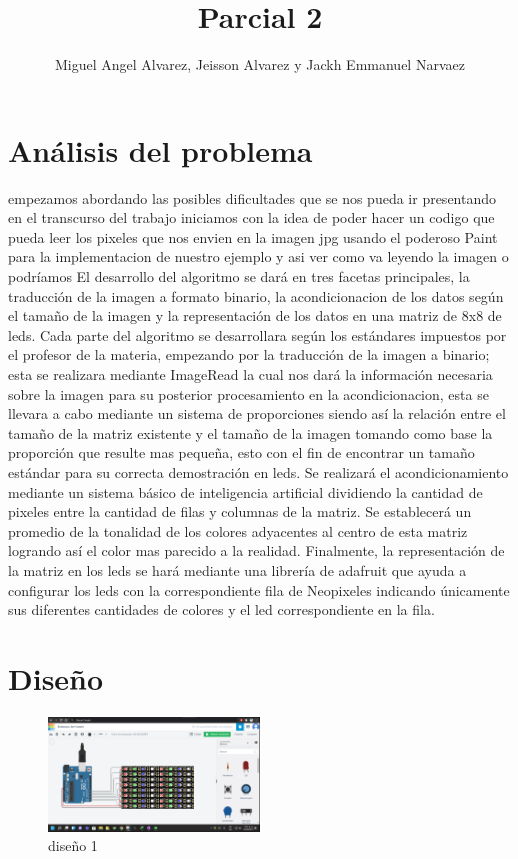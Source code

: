 \documentclass{article}
\title{Parcial 2}
\author{Miguel Angel Alvarez, Jeisson Alvarez y Jackh Emmanuel Narvaez}
\begin{document}
\maketitle



\section{Análisis del problema}

empezamos abordando las posibles dificultades que se nos pueda ir presentando en el transcurso del trabajo iniciamos con la idea de poder hacer un codigo que pueda leer los pixeles que nos envien en la imagen jpg usando el poderoso Paint para la implementacion de nuestro ejemplo y asi ver como va leyendo la imagen o podríamos El desarrollo del algoritmo se dará en tres facetas principales, la traducción de la imagen a formato binario, la acondicionacion de los datos según el tamaño de la imagen y la representación de los datos en una matriz de 8x8 de leds. Cada parte del algoritmo se desarrollara según los estándares impuestos por el profesor de la materia, empezando por la traducción de la imagen a binario; esta se realizara mediante ImageRead la cual nos dará la información necesaria sobre la imagen para su posterior procesamiento en la acondicionacion, esta se llevara a cabo mediante un sistema de proporciones siendo así la relación entre el tamaño de la matriz existente y el tamaño de la imagen tomando como base la proporción que resulte mas pequeña, esto con el fin de encontrar un tamaño estándar para su correcta demostración en leds. Se realizará el acondicionamiento mediante un sistema básico de inteligencia artificial dividiendo la cantidad de pixeles entre la cantidad de filas y columnas de la matriz. Se establecerá un promedio de la tonalidad de los colores adyacentes al centro de esta matriz logrando así el color mas parecido a la realidad. Finalmente, la representación de la matriz en los leds se hará mediante una librería de adafruit que ayuda a configurar los leds con la correspondiente fila de Neopixeles indicando únicamente sus diferentes cantidades de colores y el led correspondiente en la fila.  


\section{Diseño}

\begin{figure}
\centering
\includegraphics[width=0.5\textwidth]{image1.png}
\caption{diseño 1}
\end{figure}
\end{document}
